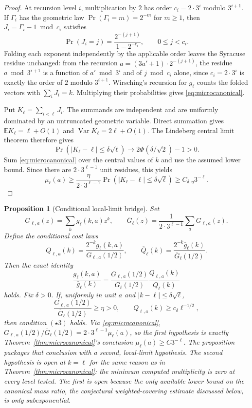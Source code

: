 \documentclass[11pt]{article}
\newtheorem{proposition}[theorem]{Proposition}
\theoremstyle{remark}
\begin{document}
\begin{proof}
At recursion level $i$, multiplication by $2$ has order
$c_i=2\cdot3^i$ modulo $3^{i+1}$. If $\Gamma_i$ has the geometric law
$\Pr(\Gamma_i=m)=2^{-m}$ for $m\ge1$, then $J_i=\Gamma_i-1\bmod c_i$
satisfies
\[
 \Pr(J_i=j)=\frac{2^{-(j+1)}}{1-2^{-c_i}},
 \qquad 0\le j<c_i.
\]
Folding each exponent independently by the applicable order leaves the
Syracuse residue unchanged: from the recursion $a=(3a'+1)\cdot
2^{-(j+1)}$, the residue $a\bmod3^{i+1}$ is a function of $a'\bmod3^i$
and of $j\bmod c_i$ alone, since $c_i=2\cdot3^i$ is exactly the order
of $2$ modulo $3^{i+1}$. Wirsching's recursion for $g_\ell$ counts
the folded vectors with $\sum_iJ_i=k$. Multiplying their probabilities
gives \eqref{eq:microcanonical}.

Put $K_\ell=\sum_{i<\ell}J_i$. The summands are independent and are
uniformly dominated by an untruncated geometric variable. Direct
summation gives
$\mathbb E K_\ell=\ell+O(1)$ and
$\operatorname{Var}K_\ell=2\ell+O(1)$. The Lindeberg central limit
theorem therefore gives
\[
 \Pr(|K_\ell-\ell|\le\delta\sqrt\ell)
 \longrightarrow 2\Phi(\delta/\sqrt2)-1>0.
\]
Sum \eqref{eq:microcanonical} over the central values of $k$ and use
the assumed lower bound. Since there are $2\cdot3^{\ell-1}$ unit
residues, this yields
\[
 \mu_\ell(a)\ge
 \frac{\eta}{2\cdot3^{\ell-1}}
 \Pr(|K_\ell-\ell|\le\delta\sqrt\ell)
 \ge C_{\delta,\eta}3^{-\ell}.
\]
\end{proof}

\begin{proposition}[Conditional local-limit bridge]
\label{prop:complex-deconditioning}
Set
\[
 G_{\ell,a}(z)=\sum_k g_\ell(k,a)z^k,\qquad
 \overline G_\ell(z)=\frac{1}{2\cdot3^{\ell-1}}\sum_aG_{\ell,a}(z).
\]
Define the conditional cost laws
\[
 Q_{\ell,a}(k)=\frac{2^{-k}g_\ell(k,a)}{G_{\ell,a}(1/2)},
 \qquad
 \overline Q_\ell(k)=
 \frac{2^{-k}\overline g_\ell(k)}{\overline G_\ell(1/2)}.
\]
Then the exact identity
\begin{equation}\label{eq:deconditioning}
 \frac{g_\ell(k,a)}{\overline g_\ell(k)}
 =
 \frac{G_{\ell,a}(1/2)}{\overline G_\ell(1/2)}
 \frac{Q_{\ell,a}(k)}{\overline Q_\ell(k)}
\end{equation}
holds. Fix $\delta>0$. If, uniformly in unit $a$ and
$|k-\ell|\le\delta\sqrt\ell$,
\[
 \frac{G_{\ell,a}(1/2)}{\overline G_\ell(1/2)}\ge\eta>0,
 \qquad
 Q_{\ell,a}(k)\ge c_\delta\ell^{-1/2},
\]
then condition $(\star3)$ holds. Via \eqref{eq:microcanonical},
$G_{\ell,a}(1/2)/\overline G_\ell(1/2)=2\cdot3^{\ell-1}\mu_\ell(a)$, so
the first hypothesis is exactly Theorem~\ref{thm:microcanonical}'s
conclusion $\mu_\ell(a)\ge C3^{-\ell}$. The proposition packages that
conclusion with a second, local-limit hypothesis. The second
hypothesis is open at
$k=\ell$ for the same reason as in Theorem~\ref{thm:microcanonical}:
the minimum computed multiplicity is zero at every level tested. The
first is open because the only
available lower bound on the canonical mass ratio, the conjectural
weighted-covering estimate discussed below, is only subexponential.
\end{proposition}
\end{document}
